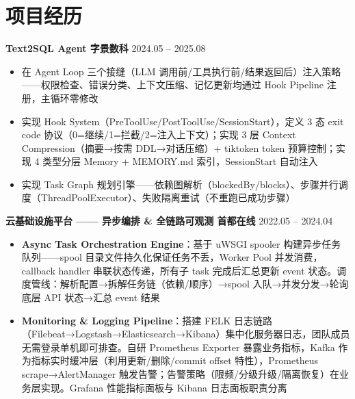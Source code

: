 \documentclass[10pt, a4paper]{article}
\newcommand{\entry}[2]{
  \vspace{0.35em}
  \noindent\textbf{#1} \hfill {\color{lightgray}\small #2}\newline
}
\begin{document}
\section{项目经历}

\entry{Text2SQL Agent \textbar{} 字景数科}{2024.05 -- 2025.08}
\begin{itemize}
  \item 在 Agent Loop 三个接缝（LLM 调用前/工具执行前/结果返回后）注入策略——权限检查、错误分类、上下文压缩、记忆更新均通过 Hook Pipeline 注册，主循环零修改

  \item 实现 Hook System（PreToolUse/PostToolUse/SessionStart），定义 3 态 exit code 协议（0=继续/1=拦截/2=注入上下文）；实现 3 层 Context Compression（摘要→按需 DDL→对话压缩）+ tiktoken token 预算控制；实现 4 类型分层 Memory + MEMORY.md 索引，SessionStart 自动注入

  \item 实现 Task Graph 规划引擎——依赖图解析（blockedBy/blocks）、步骤并行调度（ThreadPoolExecutor）、失败隔离重试（不重跑已成功步骤）
\end{itemize}

\vspace{0.3em}

\entry{云基础设施平台 —— 异步编排 \& 全链路可观测 \textbar{} 首都在线}{2022.05 -- 2024.04}
\begin{itemize}
  \item \textbf{Async Task Orchestration Engine}：基于 uWSGI spooler 构建异步任务队列——spool 目录文件持久化保证任务不丢，Worker Pool 并发消费，callback handler 串联状态传递，所有子 task 完成后汇总更新 event 状态。调度管线：解析配置→拆解任务链（依赖/顺序）→spool 入队→并发分发→轮询底层 API 状态→汇总 event 结果

  \item \textbf{Monitoring \& Logging Pipeline}：搭建 FELK 日志链路（Filebeat→Logstash→Elasticsearch→Kibana）集中化服务器日志，团队成员无需登录单机即可排查。自研 Prometheus Exporter 暴露业务指标，Kafka 作为指标实时缓冲层（利用更新/删除/commit offset 特性），Prometheus scrape→AlertManager 触发告警；告警策略（限频/分级升级/隔离恢复）在业务层实现。Grafana 性能指标面板与 Kibana 日志面板职责分离
\end{itemize}
\end{document}
